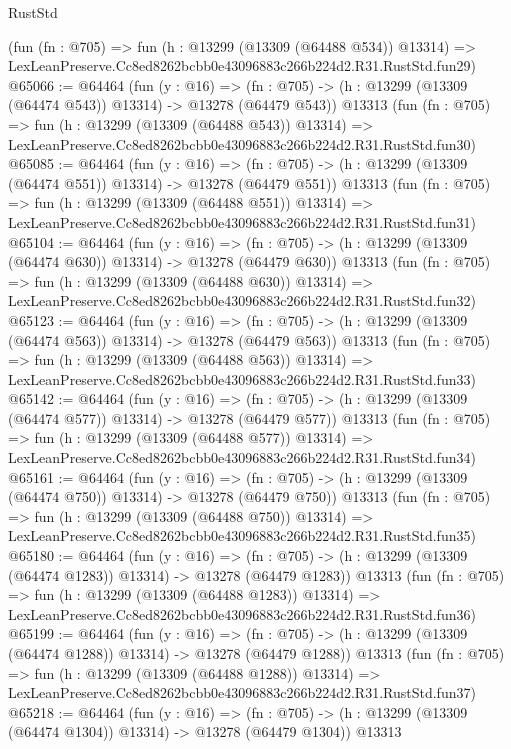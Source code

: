 \begin{lexlean}{RustStd}
\begin{coremodule}
    (fun (fn : @705) =>
    fun (h : @13299 (@13309 (@64488 @534)) @13314) =>
    LexLeanPreserve.Cc8ed8262bcbb0e43096883c266b224d2.R31.RustStd.fun29)
@65066 := @64464
    (fun (y : @16) =>
    (fn : @705) -> (h : @13299 (@13309 (@64474 @543)) @13314) -> @13278 (@64479 @543))
    @13313
    (fun (fn : @705) =>
    fun (h : @13299 (@13309 (@64488 @543)) @13314) =>
    LexLeanPreserve.Cc8ed8262bcbb0e43096883c266b224d2.R31.RustStd.fun30)
@65085 := @64464
    (fun (y : @16) =>
    (fn : @705) -> (h : @13299 (@13309 (@64474 @551)) @13314) -> @13278 (@64479 @551))
    @13313
    (fun (fn : @705) =>
    fun (h : @13299 (@13309 (@64488 @551)) @13314) =>
    LexLeanPreserve.Cc8ed8262bcbb0e43096883c266b224d2.R31.RustStd.fun31)
@65104 := @64464
    (fun (y : @16) =>
    (fn : @705) -> (h : @13299 (@13309 (@64474 @630)) @13314) -> @13278 (@64479 @630))
    @13313
    (fun (fn : @705) =>
    fun (h : @13299 (@13309 (@64488 @630)) @13314) =>
    LexLeanPreserve.Cc8ed8262bcbb0e43096883c266b224d2.R31.RustStd.fun32)
@65123 := @64464
    (fun (y : @16) =>
    (fn : @705) -> (h : @13299 (@13309 (@64474 @563)) @13314) -> @13278 (@64479 @563))
    @13313
    (fun (fn : @705) =>
    fun (h : @13299 (@13309 (@64488 @563)) @13314) =>
    LexLeanPreserve.Cc8ed8262bcbb0e43096883c266b224d2.R31.RustStd.fun33)
@65142 := @64464
    (fun (y : @16) =>
    (fn : @705) -> (h : @13299 (@13309 (@64474 @577)) @13314) -> @13278 (@64479 @577))
    @13313
    (fun (fn : @705) =>
    fun (h : @13299 (@13309 (@64488 @577)) @13314) =>
    LexLeanPreserve.Cc8ed8262bcbb0e43096883c266b224d2.R31.RustStd.fun34)
@65161 := @64464
    (fun (y : @16) =>
    (fn : @705) -> (h : @13299 (@13309 (@64474 @750)) @13314) -> @13278 (@64479 @750))
    @13313
    (fun (fn : @705) =>
    fun (h : @13299 (@13309 (@64488 @750)) @13314) =>
    LexLeanPreserve.Cc8ed8262bcbb0e43096883c266b224d2.R31.RustStd.fun35)
@65180 := @64464
    (fun (y : @16) =>
    (fn : @705) -> (h : @13299 (@13309 (@64474 @1283)) @13314) -> @13278 (@64479 @1283))
    @13313
    (fun (fn : @705) =>
    fun (h : @13299 (@13309 (@64488 @1283)) @13314) =>
    LexLeanPreserve.Cc8ed8262bcbb0e43096883c266b224d2.R31.RustStd.fun36)
@65199 := @64464
    (fun (y : @16) =>
    (fn : @705) -> (h : @13299 (@13309 (@64474 @1288)) @13314) -> @13278 (@64479 @1288))
    @13313
    (fun (fn : @705) =>
    fun (h : @13299 (@13309 (@64488 @1288)) @13314) =>
    LexLeanPreserve.Cc8ed8262bcbb0e43096883c266b224d2.R31.RustStd.fun37)
@65218 := @64464
    (fun (y : @16) =>
    (fn : @705) -> (h : @13299 (@13309 (@64474 @1304)) @13314) -> @13278 (@64479 @1304))
    @13313

\end{coremodule}
\end{lexlean}
